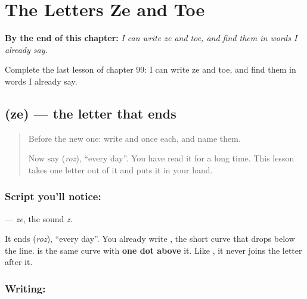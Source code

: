 
\chapter{The Letters Ze and Toe}
\label{ch:ur-letters-ze-toe}

\begin{chapteropening}
\textbf{By the end of this chapter:} \emph{I can write ze and toe, and find them in words I already say.}

Complete the last lesson of chapter 99: I can write ze and toe, and find them in words I already say.
\end{chapteropening}

\section[\texorpdfstring{\ur{ز} (ze)}{ز (ze)}]{ (ze) — the letter that ends }

\label{lesson:UR-W99-ze}



\begin{quote}
Before the new one: write  and  once each, and name them.

Now say \textbf{} (\emph{roz}), \textquotedblleft{}every day\textquotedblright{}. You have read it for a long time. This lesson takes one letter out of it and puts it in your hand.
\end{quote}

\subsection*{Script you'll notice: }
\textbf{} — \emph{ze}, the sound \emph{z}.

It ends \textbf{} (\emph{roz}), \textquotedblleft{}every day\textquotedblright{}. You already write \textbf{}, the short curve that drops below the line. \textbf{} is the same curve with \textbf{one dot above} it. Like \textbf{}, it never joins the letter after it.

\subsection*{Writing: }

